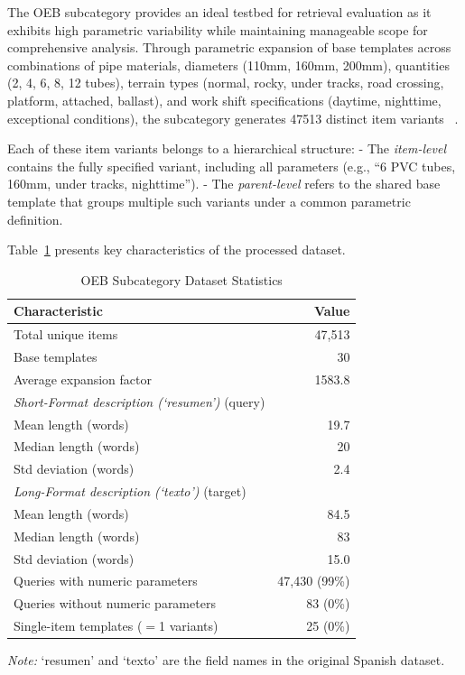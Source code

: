 \documentclass[preprint,12pt]{elsarticle}
\begin{document}
The OEB subcategory provides an ideal testbed for retrieval evaluation as it exhibits high parametric variability while maintaining manageable scope for comprehensive analysis. Through parametric expansion of base templates across combinations of pipe materials, diameters (110mm, 160mm, 200mm), quantities (2, 4, 6, 8, 12 tubes), terrain types (normal, rocky, under tracks, road crossing, platform, attached, ballast), and work shift specifications (daytime, nighttime, exceptional conditions), the subcategory generates 47513 distinct item variants ~\cite{bc3cat_dataset}.

Each of these item variants belongs to a hierarchical structure:  
- The \emph{item-level} contains the fully specified variant, including all parameters (e.g., “6 PVC tubes, 160mm, under tracks, nighttime”).  
- The \emph{parent-level} refers to the shared base template that groups multiple such variants under a common parametric definition.

Table~\ref{tab:dataset_statistics} presents key characteristics of the processed dataset.

\begin{table}[ht]
\centering
\caption{OEB Subcategory Dataset Statistics}
\label{tab:dataset_statistics}
\begin{tabular}{|l|r|}
\hline
\textbf{Characteristic} & \textbf{Value} \\
\hline
Total unique items & 47,513 \\
Base templates & 30 \\
Average expansion factor & 1583.8 \\
\hline
\textit{Short-Format description (`resumen')} (query) & \\
\quad Mean length (words) & 19.7 \\
\quad Median length (words) & 20 \\
\quad Std deviation (words) & 2.4 \\
\hline
\textit{Long-Format description (`texto')} (target) & \\
\quad Mean length (words) & 84.5 \\
\quad Median length (words) & 83 \\
\quad Std deviation (words) & 15.0 \\
\hline
Queries with numeric parameters & 47,430 (99\%) \\
Queries without numeric parameters & 83 (0\%) \\
Single-item templates ($=$1 variants) & 25 (0\%) \\
\hline
\end{tabular}
\end{table}
\smallskip
\small\textit{Note:} `resumen' and `texto' are the field names in the original Spanish dataset.
\smallskip
\end{document}
